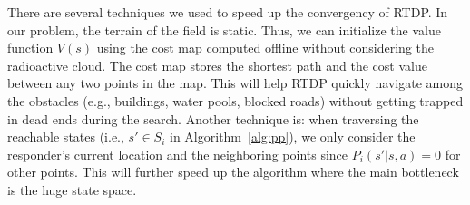 There are several techniques we used to speed up the convergency of
RTDP. In our problem, the terrain of the field is static. Thus, we
can initialize the value function $V(s)$ using the cost map
computed offline without considering the radioactive cloud. The
cost map stores the shortest path and the cost value between any
two points in the map. This will help RTDP quickly navigate among
the obstacles (e.g., buildings, water pools, blocked roads) without
getting trapped in dead ends during the search. Another technique
is: when traversing the reachable states (i.e., $s'\in S_i$ in
Algorithm~\ref{alg:pp}), we only consider the responder's current
location and the neighboring points since $P_i(s'|s,a) = 0$ for
other points. This will further speed up the algorithm where the
main bottleneck is the huge state space.
